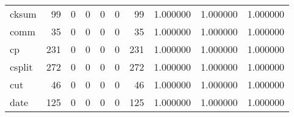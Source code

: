 \begin{longtable}{lrrrrrrrrr}
cksum     &                                        99 &                                                  0 &                                                  0 &                                                  0 &                                                  0 &                                                 99 &                                           1.000000 &                               1.000000 &                             1.000000 \\
comm      &                                        35 &                                                  0 &                                                  0 &                                                  0 &                                                  0 &                                                 35 &                                           1.000000 &                               1.000000 &                             1.000000 \\
cp        &                                       231 &                                                  0 &                                                  0 &                                                  0 &                                                  0 &                                                231 &                                           1.000000 &                               1.000000 &                             1.000000 \\
csplit    &                                       272 &                                                  0 &                                                  0 &                                                  0 &                                                  0 &                                                272 &                                           1.000000 &                               1.000000 &                             1.000000 \\
cut       &                                        46 &                                                  0 &                                                  0 &                                                  0 &                                                  0 &                                                 46 &                                           1.000000 &                               1.000000 &                             1.000000 \\
date      &                                       125 &                                                  0 &                                                  0 &                                                  0 &                                                  0 &                                                125 &                                           1.000000 &                               1.000000 &                             1.000000 \\

\end{longtable}
